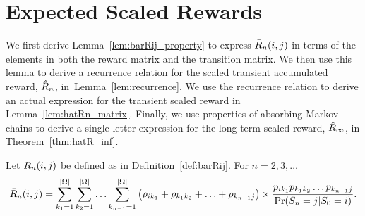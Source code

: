 \section{Expected Scaled Rewards}
\label{subsec:scaled_rewards}

We first derive Lemma~\ref{lem:barRij_property} to express $\bar{R}_{n}(i, j)$ in terms of the elements in both the reward matrix and the transition matrix.  We then use this lemma to derive a recurrence relation for the scaled transient accumulated reward, $\hat{R}_{n}$, in~Lemma~\ref{lem:recurrence}.  We use the recurrence relation to derive an actual expression for the transient scaled reward in Lemma~\ref{lem:hatRn_matrix}.  Finally, we use properties of absorbing Markov chains to derive a single letter expression for the long-term scaled reward, $\hat{R}_{\infty}$, in Theorem~\ref{thm:hatR_inf}.

\begin{myLemma}
	\label{lem:barRij_property}
	Let $\bar{R}_{n}(i, j)$ be defined as in Definition~\ref{def:barRij}.  For $n = 2, 3, \ldots$
	\begin{equation}
		\bar{R}_{n}(i, j) = \sum_{k_1=1}^{|\Omega|} \sum_{k_2 = 1}^{|\Omega|} \ldots \sum_{k_{n-1} = 1}^{|\Omega|} \left( \rho_{ik_1} + \rho_{k_1k_2} + \ldots + \rho_{k_{n-1}j}\right) \times \frac{p_{ik_1}p_{k_1k_2} \ldots p_{k_{n-1}j}}{\operatorname{Pr}(S_{n} = j| S_{0} = i)}.
	\end{equation}
\end{myLemma}


